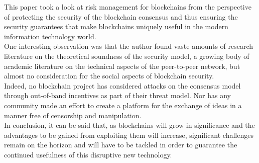 \documentclass[12pt,a4paper]{article}
\begin{document}
This paper took a look at risk management for \gls{blockchain}s from the perspective of protecting the security of the blockchain consensus and thus ensuring the security guarantees that make \gls{blockchain}s uniquely useful in the modern information technology world.\\

One interesting observation was that the author found vaste amounts of research literature on the theoretical soundness of the security model, a growing body of academic literature on the technical aspects of the peer-to-peer network, but almost no consideration for the social aspects of blockchain security.\\

Indeed, no blockchain project has considered attacks on the consensus model through out-of-band incentives as part of their threat model. Nor has any community made an effort to create a platform for the exchange of ideas in a manner free of censorship and manipulation.\\

In conclusion, it can be said that, as \gls{blockchain}s will grow in significance and the advantages to be gained from exploiting them will increase, significant challenges remain on the horizon and will have to be tackled in order to guarantee the continued usefulness of this disruptive new technology.\\
\end{document}
